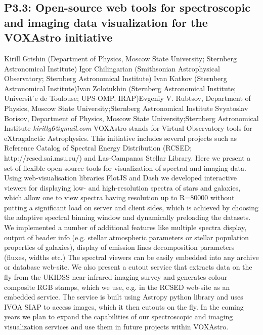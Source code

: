 \documentclass{report}
\begin{document}
\subsection*{P3.3: Open-source web tools for spectroscopic and imaging data visualization for the VOXAstro initiative}
\bigskip
Kirill Grishin (Department of Physics, Moscow State University; Sternberg Astronomical Institute) \newline Igor Chilingarian (Smithsonian Astrophysical Observatory; Sternberg Astronomical Institute) \newline  Ivan Katkov (Sternberg Astronomical Institute)\newline  Ivan Zolotukhin (Sternberg Astronomical Institute; Universit ́e de Toulouse; UPS-OMP, IRAP)\newline  \newline  Evgeniy V. Rubtsov, Department of Physics, Moscow State University;Sternberg Astronomical Institute
Svyatoslav Borisov, Department of Physics, Moscow State University;Sternberg Astronomical Institute\newline\newline
{\it kirillg6@gmail.com}\newline
\newline\newline
VOXAstro stands for Virtual Observatory tools for eXtragalactic Astrophysics. This initiative includes several projects such as Reference Catalog of Spectral Energy Distribution (RCSED; http://rcsed.sai.msu.ru/) and Las-Campanas Stellar Library. Here we present a set of flexible open-source tools for visualization of spectral and imaging data. Using web-visualisation libraries FlotJS and Dash we developed interactive viewers for displaying low- and high-resolution spectra of stars and galaxies, which allow one to view spectra having resolution up to R=80000 without putting a significant load on server and client sides, which is achieved by choosing the adaptive spectral binning window and dynamically preloading the datasets. We implemented a number of additional features like multiple spectra display, output of header info (e.g. stellar atmospheric parameters or stellar population properties of galaxies), display of emission lines decomposition parameters (fluxes, widths etc.) The spectral viewers can be easily embedded into any archive or database web-site. We also present a cutout service that extracts data on the fly from the UKIDSS near-infrared imaging survey and generates colour composite RGB stamps, which we use, e.g. in the RCSED web-site as an embedded service. The service is built using Astropy python library and uses IVOA SIAP to access images, which it then cutouts on the fly. In the coming years we plan to expand the capabilities of our spectroscopic and imaging visualization services and use them in future projects within VOXAstro.\newline
\newpage
\end{document}
